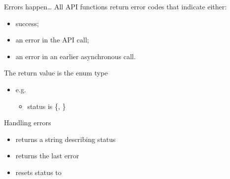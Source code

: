 \documentclass[aspectratio=43]{beamer}
\begin{document}
\begin{frame}[fragile]{}

    \begin{info}{Errors happen\ldots}
        All API functions return error codes that indicate either:
        \begin{itemize}
            \item success;
            \item an error in the API call;
            \item an error in an earlier asynchronous call.
        \end{itemize}
        The return value is the enum type 
        \begin{itemize}
            \item e.g. 
            \begin{itemize}
                \item status is \{, \}
            \end{itemize}
        \end{itemize}
    \end{info}

    \begin{info}{Handling errors}
        \centering {}
        \begin{itemize}
            \item returns a string describing status
        \end{itemize}
        \centering {}
        \begin{itemize}
            \item returns the last error
            \item resets status to 
        \end{itemize}
    \end{info}

\end{frame}
\end{document}
